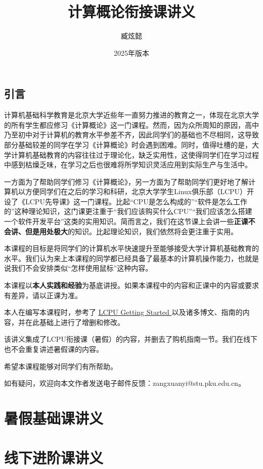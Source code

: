 \documentclass[12pt]{report}
\title{\Huge\textbf{计算概论衔接课讲义}}
\author[a]{臧炫懿}
\affil[a]{北京大学信息科学技术学院}
\date{2025年版本}
\let\oldhref\href
\renewcommand{\href}[2]{%
  \oldhref{#1}{%
    \color{blue}\underline{#2}%
    \raisebox{0.2ex}{\tiny$\nearrow$}%
  }%
}
\begin{document}
\maketitle

\tableofcontents

\newpage

\chapter*{引言}

计算机基础科学教育是北京大学近些年一直努力推进的教育之一，体现在北京大学的所有学生都应修习《计算概论》这一门课程。然而，因为众所周知的原因，高中乃至初中对于计算机的教育水平参差不齐，因此同学们的基础也不尽相同，这导致部分基础较差的同学在学习《计算概论》时会遇到困难。同时，值得吐槽的是，大学计算机基础教育的内容往往过于理论化，缺乏实用性，这使得同学们在学习过程中感到枯燥乏味，在学习之后也很难将所学知识灵活应用到实际生产与生活中。

一方面为了帮助同学们修习《计算概论》，另一方面为了帮助同学们更好地了解计算机以方便同学们在之后的学习和科研，北京大学学生Linux俱乐部（LCPU）开设了《LCPU先导课》这一门课程。比起“CPU是怎么构成的”“软件是怎么工作的”这种理论知识，这门课更注重于“我们应该购买什么CPU”“我们应该怎么搭建一个软件开发平台”这类的实用知识。简而言之，我们在这节课上会讲一些\textbf{正课不会讲、但是用处极大}的知识。比起理论知识，我们依然将会更注重于实用。

本课程的目标是将同学们的计算机水平快速提升至能够接受大学计算机基础教育的水平。我们认为来上本课程的同学都已经具备了最基本的计算机操作能力，也就是说我们不会安排类似“怎样使用鼠标”这种内容。

本课程以\textbf{本人实践和经验}为基底讲授。如果本课程中的内容和正课中的内容或要求有差异，请以正课为准。

本人在编写本课程时，参考了\href{https://missing.lcpu.dev}{LCPU Getting Started}以及诸多博文、指南的内容，并在此基础上进行了增删和修改。

该讲义集成了LCPU衔接课（暑假）的内容，并删去了购机指南一节。我们在线下也不会重复讲述暑假课的内容。

希望本课程能够对同学们有所帮助。

如有疑问，欢迎向本文作者发送电子邮件反馈：zangxuanyi@stu.pku.edu.cn。

\part{暑假基础课讲义}







\part{线下进阶课讲义}








\end{document}
